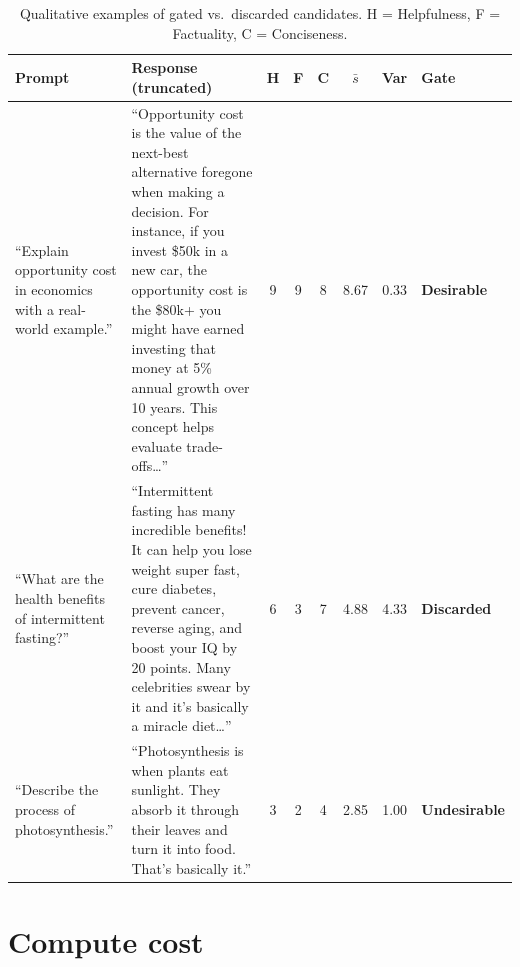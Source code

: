 \documentclass{article}
\begin{document}
\begin{table}[h]
\centering
\caption{Qualitative examples of gated vs.\ discarded candidates. H = Helpfulness, F = Factuality, C = Conciseness.}
\label{tab:qualitative}
\vspace{0.5em}
\small
\begin{tabular}{p{2.8cm} p{7.2cm} ccc cc l}
\toprule
\textbf{Prompt} & \textbf{Response (truncated)} & \textbf{H} & \textbf{F} & \textbf{C} & $\bar{s}$ & \textbf{Var} & \textbf{Gate} \\
\midrule
\raggedright ``Explain opportunity cost in economics with a real-world example.'' &
``Opportunity cost is the value of the next-best alternative foregone when making a decision. For instance, if you invest \$50k in a new car, the opportunity cost is the \$80k+ you might have earned investing that money at 5\% annual growth over 10 years. This concept helps evaluate trade-offs\ldots'' &
9 & 9 & 8 & 8.67 & 0.33 & \textcolor{descolor}{\textbf{Desirable}} \\
\midrule
\raggedright ``What are the health benefits of intermittent fasting?'' &
``Intermittent fasting has many incredible benefits! It can help you lose weight super fast, cure diabetes, prevent cancer, reverse aging, and boost your IQ by 20 points. Many celebrities swear by it and it's basically a miracle diet\ldots'' &
6 & 3 & 7 & 4.88 & 4.33 & \textcolor{disccolor}{\textbf{Discarded}} \\
\midrule
\raggedright ``Describe the process of photo\-synthesis.'' &
``Photosynthesis is when plants eat sunlight. They absorb it through their leaves and turn it into food. That's basically it.'' &
3 & 2 & 4 & 2.85 & 1.00 & \textcolor{undcolor}{\textbf{Undesirable}} \\
\bottomrule
\end{tabular}
\end{table}

\section{Compute cost}
\label{app:compute}
\end{document}
